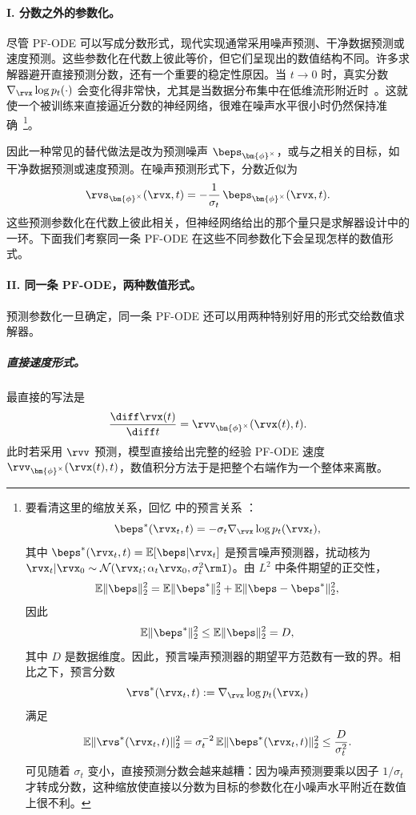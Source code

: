 \paragraph{I. 分数之外的参数化。}
尽管 PF-ODE 可以写成分数形式，现代实现通常采用噪声预测、干净数据预测或速度预测。这些参数化在代数上彼此等价，但它们呈现出的数值结构不同。许多求解器避开直接预测分数，还有一个重要的稳定性原因。当 $t\to 0$ 时，真实分数 $\nabla_{\rvx}\log p_t(\cdot)$ 会变化得非常快，尤其是当数据分布集中在低维流形附近时~\citep{kim2022soft}。这就使一个被训练来直接逼近分数的神经网络，很难在噪声水平很小时仍然保持准确~\footnote{要看清这里的缩放关系，回忆  中的预言关系
：
\[
    \beps^*(\rvx_t,t)
    =
    -\sigma_t\nabla_{\rvx}\log p_t(\rvx_t),
\]
其中 $\beps^*(\rvx_t,t)
    =
    \mathbb{E}[\beps|\rvx_t]$ 是预言噪声预测器，扰动核为 $ \rvx_t|\rvx_0
    \sim
    \mathcal{N}(\rvx_t; \alpha_t\rvx_0,\sigma_t^2\rmI)$。由 $L^2$ 中条件期望的正交性，
\[
    \mathbb{E}\|\beps\|_2^2
    =
    \mathbb{E}\|\beps^*\|_2^2
    +
    \mathbb{E}\|\beps-\beps^*\|_2^2,
\]
因此
\[
    \mathbb{E}\|\beps^*\|_2^2
    \le
    \mathbb{E}\|\beps\|_2^2
    =
    D,
\]
其中 $D$ 是数据维度。因此，预言噪声预测器的期望平方范数有一致的界。相比之下，预言分数
\[
    \rvs^*(\rvx_t,t)
    :=
    \nabla_{\rvx}\log p_t(\rvx_t)
\]
满足
\[
    \mathbb{E}\|\rvs^*(\rvx_t,t)\|_2^2
    =
    \sigma_t^{-2}\,
    \mathbb{E}\|\beps^*(\rvx_t,t)\|_2^2
    \le
    \frac{D}{\sigma_t^2}.
\]
可见随着 $\sigma_t$ 变小，直接预测分数会越来越糟：因为噪声预测要乘以因子 $1/\sigma_t$ 才转成分数，这种缩放使直接以分数为目标的参数化在小噪声水平附近在数值上很不利。}。


因此一种常见的替代做法是改为预测噪声 $\beps_{\bm{\phi}^\times}$，或与之相关的目标，如干净数据预测或速度预测。在噪声预测形式下，分数近似为
\[
    \rvs_{\bm{\phi}^\times}(\rvx,t)
    =
    -\frac{1}{\sigma_t}\,
    \beps_{\bm{\phi}^\times}(\rvx,t).
\]
这些预测参数化在代数上彼此相关，但神经网络给出的那个量只是求解器设计中的一环。下面我们考察同一条 PF-ODE 在这些不同参数化下会呈现怎样的数值形式。


\paragraph{II. 同一条 PF-ODE，两种数值形式。}
预测参数化一旦确定，同一条 PF-ODE 还可以用两种特别好用的形式交给数值求解器。

\subparagraph{直接速度形式。}
最直接的写法是
\begin{equation}
\label{eq:direct-pfode-form}
\frac{\diff \rvx(t)}{\diff t}
=
\rvv_{\bm{\phi}^\times}(\rvx(t),t).
\end{equation}
此时若采用 $\rvv$ 预测，模型直接给出完整的经验 PF-ODE 速度 $\rvv_{\bm{\phi}^\times}(\rvx(t),t)$，数值积分方法于是把整个右端作为一个整体来离散。

